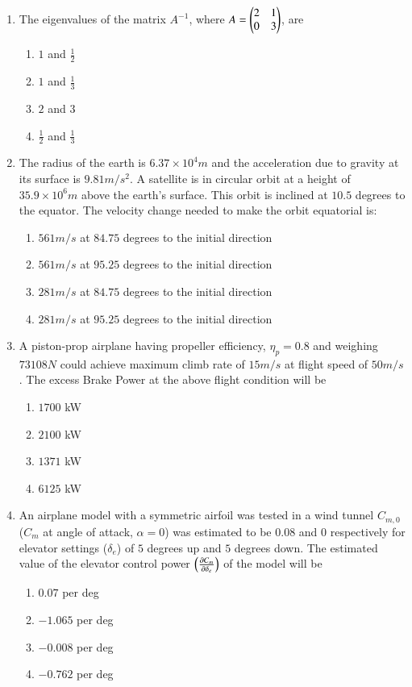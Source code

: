 \documentclass[journal]{IEEEtran}
\begin{document}
\begin{enumerate}
	\item The eigenvalues of the matrix $A^{-1}$, where $A = \begin{pmatrix}2&1\\0&3\end{pmatrix}$, are
		\begin{enumerate}
			\item $1$ and $\frac{1}{2}$
			\item $1$ and $\frac{1}{3}$
			\item $2$ and $3$
			\item $\frac{1}{2}$ and $\frac{1}{3}$
		\end{enumerate}

	\item The radius of the earth is $6.37 \times 10^4 m$ and the acceleration due to gravity at its surface is $9.81 m / s^2$. A satellite is in circular orbit at a height of $35.9\times 10^6 m$ above the earth's surface. This orbit is inclined at $10.5$ degrees to the equator. The velocity change needed to make the orbit equatorial is:
		\begin{enumerate}
			\item $561 m / s$ at $84.75$ degrees to the initial direction
			\item $561 m / s$ at $95.25$ degrees to the initial direction
			\item $281 m / s$ at $84.75$ degrees to the initial direction
			\item $281 m / s$ at $95.25$ degrees to the initial direction
		\end{enumerate}

	\item A piston-prop airplane having propeller efficiency, $\eta_p = 0.8$ and weighing $73108 N$ could achieve maximum climb rate of $15m/s$ at flight speed of $50m/s$. The excess Brake Power  at the above flight condition will be
		\begin{enumerate}
			\item $1700$ kW
			\item $2100$ kW
			\item $1371$ kW
			\item $6125$ kW
		\end{enumerate}
	\item An airplane model with a symmetric airfoil was tested in a wind tunnel $C_{m,0}$ ($C_m$ at angle of attack, $\alpha = 0$) was estimated to be $0.08$ and $0$ respectively for elevator settings ($\delta _ e$) of $5$ degrees up and $5$ degrees down. The estimated value of the elevator control power $\left(\frac{\partial C_m}{\partial \delta _ e}\right)$ of the model will be 
		\begin{enumerate}
			\item $0.07$ per deg
			\item $-1.065$ per deg
			\item $-0.008$ per deg
			\item $-0.762$ per deg
		\end{enumerate}


\end{enumerate}
\end{document}
